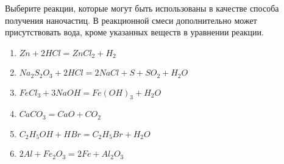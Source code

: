 
Выберите реакции, которые могут быть использованы
в качестве способа получения наночастиц. В реакционной смеси дополнительно может присутствовать вода, кроме указанных веществ в уравнении реакции.

\begin{enumerate}
    \item $Zn+2HCl = ZnCl_2 + H_2$
    \item $Na_2S_2O_3 + 2HCl = 2NaCl + S + SO_2 +H_2O$
    \item $FeCl_3 + 3NaOH = Fe(OH)_3 + H_2O$
    \item $CaCO_3 = CaO + CO_2$
    \item $C_2H_5OH + HBr = C_2H_5Br + H_2O$
    \item $2Al + Fe_2O_3 = 2Fe + Al_2O_3$
\end{enumerate}

